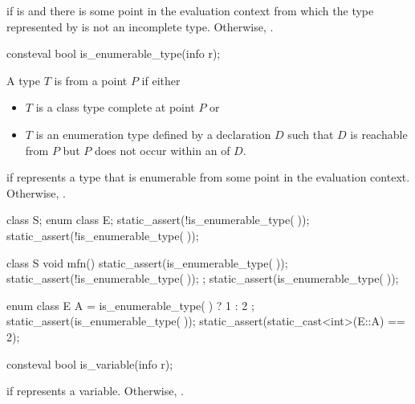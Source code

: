 \begin{itemdescr}
\pnum
\returns
{} if  is 
and there is some point in the evaluation context
from which the type represented by 
is not an incomplete type.
Otherwise, .
\end{itemdescr}

%
\begin{itemdecl}
consteval bool is_enumerable_type(info r);
\end{itemdecl}

\begin{itemdescr}
\pnum
A type $T$ is  from a point $P$ if either
\begin{itemize}
\item
  $T$ is a class type complete at point $P$ or
\item
  $T$ is an enumeration type defined by a declaration $D$
  such that $D$ is reachable from $P$
  but $P$ does not occur within an  of $D$.
\end{itemize}

\pnum
\returns
{} if  represents a type that is enumerable
from some point in the evaluation context.
Otherwise, .
\begin{example}
\begin{codeblock}
class S;
enum class E;
static_assert(!is_enumerable_type(^^S));
static_assert(!is_enumerable_type(^^E));

class S {
  void mfn() {
    static_assert(is_enumerable_type(^^S));
  }
  static_assert(!is_enumerable_type(^^S));
};
static_assert(is_enumerable_type(^^S));

enum class E {
  A = is_enumerable_type(^^E) ? 1 : 2
};
static_assert(is_enumerable_type(^^E));
static_assert(static_cast<int>(E::A) == 2);
\end{codeblock}
\end{example}
\end{itemdescr}

%
\begin{itemdecl}
consteval bool is_variable(info r);
\end{itemdecl}

\begin{itemdescr}
\pnum
\returns
{} if  represents a variable.
Otherwise, .
\end{itemdescr}

